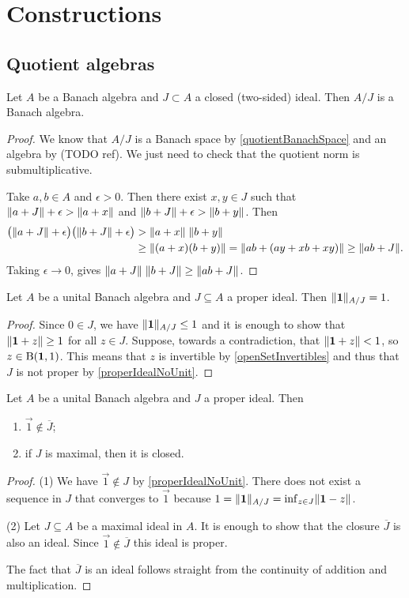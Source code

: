 \section{Constructions}
\subsection{Quotient algebras}
\begin{proposition} \label{quotientBanachAlgebra}
Let $A$ be a Banach algebra and $J\subset A$ a closed (two-sided) ideal. Then $A/J$ is a Banach algebra.
\end{proposition}
\begin{proof}
We know that $A/J$ is a Banach space by \ref{quotientBanachSpace} and an algebra by (TODO ref). We just need to check that the quotient norm is submultiplicative.

Take $a,b\in A$ and $\epsilon>0$. Then there exist $x,y\in J$ such that $\lVert a+J\rVert + \epsilon > \lVert a+x\rVert$ and $\lVert b+J\rVert + \epsilon > \lVert b+y\rVert$. Then
\begin{align*}
\big(\lVert a+J\rVert + \epsilon\big)\big(\lVert b+J\rVert + \epsilon\big) &> \lVert a+x\rVert\;\lVert b+y\rVert \\
&\geq \lVert(a+x)(b+y)\rVert = \lVert ab + (ay+xb+xy)\rVert \geq \lVert ab + J\rVert.
\end{align*}
Taking $\epsilon\to 0$, gives $\lVert a+J\rVert\;\lVert b+J\rVert \geq \lVert ab + J\rVert$.
\end{proof}

\begin{proposition}
Let $A$ be a unital Banach algebra and $J\subseteq A$ a proper ideal. Then $\lVert\boldsymbol{\mathrm{1}}\rVert_{A/J} = 1$.
\end{proposition}
\begin{proof}
Since $0\in J$, we have $\lVert\boldsymbol{\mathrm{1}}\rVert_{A/J} \leq 1$ and it is enough to show that $\lVert\boldsymbol{\mathrm{1}}+z\rVert \geq 1$ for all $z\in J$. Suppose, towards a contradiction, that $\lVert\boldsymbol{\mathrm{1}}+z\rVert < 1$, so $z\in \operatorname{B}(\boldsymbol{\mathrm{1}},1)$. This means that $z$ is invertible by \ref{openSetInvertibles} and thus that $J$ is not proper by \ref{properIdealNoUnit}.
\end{proof}
\begin{corollary}
Let $A$ be a unital Banach algebra and $J$ a proper ideal. Then
\begin{enumerate}
\item $\vec{1} \notin \overline{J}$;
\item if $J$ is maximal, then it is closed.
\end{enumerate}
\end{corollary}
\begin{proof}
(1) We have $\vec{1}\notin J$ by \ref{properIdealNoUnit}. There does not exist a sequence in $J$ that converges to $\vec{1}$ because $1 = \lVert\boldsymbol{\mathrm{1}}\rVert_{A/J} = \inf_{z\in J}\lVert\boldsymbol{\mathrm{1}}-z\rVert$.

(2) Let $J\subseteq A$ be a maximal ideal in $A$. It is enough to show that the closure $\overline{J}$ is also an ideal. Since $\vec{1}\notin \overline{J}$ this ideal is proper.

The fact that $\overline{J}$ is an ideal follows straight from the continuity of addition and multiplication.
\end{proof}


